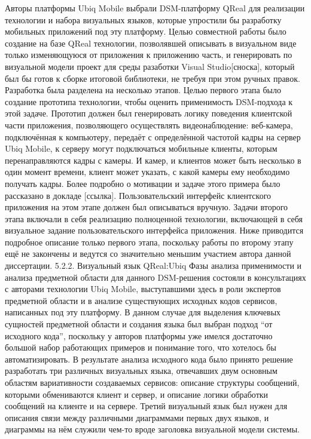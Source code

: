 	Авторы платформы Ubiq Mobile выбрали DSM-платформу QReal для реализации технологии и набора визуальных языков, которые упростили бы разработку мобильных приложений под эту платформу. Целью совместной работы было создание на базе QReal технологии, позволявшей описывать в визуальном виде только изменяющуюся от приложения к приложению часть, и генерировать по визуальной модели проект для среды разаботки Visual Studio[сноска], который был бы готов к сборке итоговой библиотеки, не требуя при этом ручных правок. 
Разработка была разделена на несколько этапов. Целью первого этапа было создание прототипа технологии, чтобы оценить применимость DSM-подхода к этой задаче. Прототип должен был генерировать логику поведения клиентской части приложения, позволяющего осуществлять видеонаблюдение: веб-камера, подключённая к компьютеру, передаёт с определённой частотой кадры на сервер Ubiq Mobile, к серверу могут подключаться мобильные клиенты, которым перенаправляются кадры с камеры. И камер, и клиентов может быть несколько в один момент времени, клиент может указать, с какой камеры ему необходимо получать кадры. Более подробно о мотивации и задаче этого примера было рассказано в докладе [ссылка]. Пользовательский интерфейс клиентского приложения на этом этапе должен был описываться вручную. Задачи второго этапа включали в себя реализацию полноценной технологии, включающей в себя визуальное задание пользовательского интерфейса приложения. Ниже приводится подробное описание только первого этапа, поскольку работы по второму этапу ещё не закончены и ведутся со значительно меньшим участием автора данной диссертации.
5.2.2. Визуальный язык QReal:Ubiq
	Фазы анализа применимости и анализа предметной области для данного DSM-решения состояли в консультациях с авторами технологии Ubiq Mobile, выступавшими здесь в роли экспертов предметной области и в анализе существующих исходных кодов сервисов, написанных под эту платформу. В данном случае для выделения ключевых сущностей предметной области и создания языка был выбран подход “от исходного кода”, поскольку у авторов платформы уже имелся достаточно большой набор работающих примеров и понимание того, что хотелось бы автоматизировать.
	В результате анализа исходного кода было принято решение разработать три различных визуальных языка, отвечавших двум основным областям вариативности создаваемых сервисов: описание структуры сообщений, которыми обмениваются клиент и сервер, и описание логики обработки сообщений на клиенте и на сервере. Третий визуальный язык был нужен для описания связи между различными диаграммами первых двух языков, и диаграммы на нём служили чем-то вроде заголовка визуальной модели системы. 
